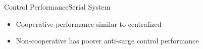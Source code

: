 \begin{frame}[plain]{Control Performance}{Serial System}
{\begin{minipage}{0.48\linewidth}
    \end{minipage}
    \begin{minipage}{0.48\linewidth}
      
    \end{minipage}
  }
  \begin{minipage}{0.48\linewidth}
    \begin{itemize}
      \item Cooperative performance similar to centralized
      \item \alert{Non-cooperative has poorer anti-surge control performance}
    \end{itemize}
  \end{minipage}

\end{frame}

